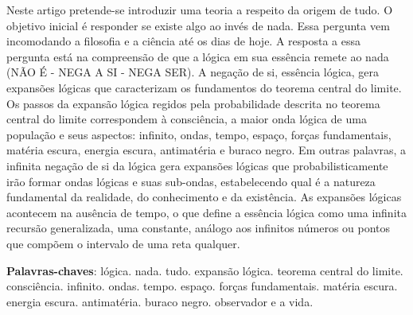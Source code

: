 \setlength{\droptitle}{-50pt}
\maketitle
\vspace{-10mm}
\begin{resumoumacoluna}
	\vspace{-2mm}
	Neste artigo pretende-se introduzir uma teoria a respeito da origem de tudo. O objetivo inicial é responder se existe algo ao invés de nada. Essa pergunta vem incomodando a filosofia e a ciência até os dias de hoje. A resposta a essa pergunta está na compreensão de que a lógica em sua essência remete ao nada (NÃO É - NEGA A SI - NEGA SER). A negação de si, essência lógica, gera expansões lógicas que caracterizam os fundamentos do teorema central do limite. Os passos da expansão lógica regidos pela probabilidade descrita no teorema central do limite correspondem à consciência, a maior onda lógica de uma população e seus aspectos: infinito, ondas, tempo, espaço, forças fundamentais, matéria escura, energia escura, antimatéria e buraco negro. Em outras palavras, a infinita negação de si da lógica gera expansões lógicas que probabilisticamente irão formar ondas lógicas e suas sub-ondas, estabelecendo qual é a natureza fundamental da realidade, do conhecimento e da existência. As expansões lógicas acontecem na ausência de tempo, o que define a essência lógica como uma infinita recursão generalizada, uma constante, análogo aos infinitos números ou pontos que compõem o intervalo de uma reta qualquer.
 	
 	\noindent
	\textbf{Palavras-chaves}: lógica. nada. tudo. expansão lógica. teorema central do limite. consciência. infinito. ondas. tempo. espaço. forças fundamentais. matéria escura. energia escura. antimatéria. buraco negro. observador e a vida.
\end{resumoumacoluna}

